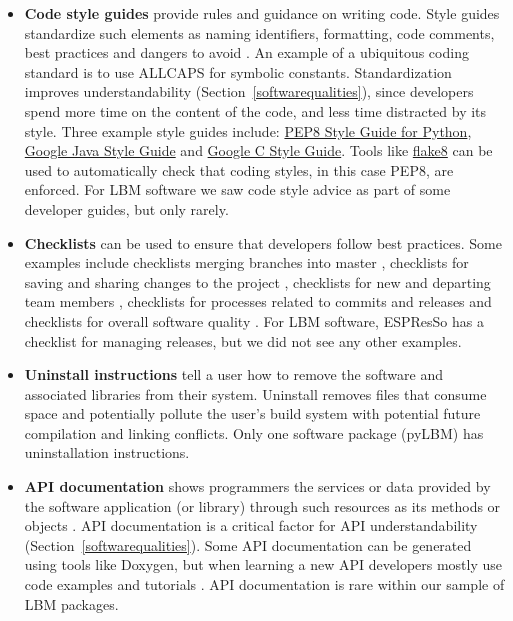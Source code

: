 \documentclass[final, 3p, times, authoryear]{elsarticle}
\newcommand{\CC}{C\nolinebreak\hspace{-.05em}\raisebox{.4ex}{\small\bf
+}\nolinebreak\hspace{-.10em}\raisebox{.4ex}{\small\bf +}}
\begin{document}
\begin{itemize}
\item \textbf{Code style guides} provide rules and guidance on writing code.
Style guides standardize such elements as naming identifiers, formatting, code
comments, best practices and dangers to avoid \citep{Carty2020}. An example of a
ubiquitous coding standard is to use ALLCAPS for symbolic constants.
Standardization improves understandability (Section~\ref{softwarequalities}),
since developers spend more time on the content of the code, and less time
distracted by its style.  Three example style guides include:
\href{http://cnl.sogang.ac.kr/cnlab/lectures/programming/python/PEP8_Style_Guide.pdf}
{PEP8 Style Guide for Python},
\href{https://google.github.io/styleguide/javaguide.html} {Google Java Style
Guide} and \href{https://google.github.io/styleguide/cppguide.html} {Google \CC
Style Guide}.  Tools like \href{https://pypi.org/project/flake8/}{flake8} can be
used to automatically check that coding styles, in this case PEP8, are enforced.
For LBM software we saw code style advice as part of some developer guides, but
only rarely.

\item \textbf{Checklists} can be used to ensure that developers follow best
practices.  Some examples include checklists merging branches into master
\citep{Brown2015}, checklists for saving and sharing changes to the project
\citep{WilsonEtAl2016}, checklists for new and departing team members
\citep{HerouxAndBernholdt2018}, checklists for processes related to commits and
releases \citep{HerouxEtAl2008} and checklists for overall software quality
\citep{ThielEtAl2020, SSI2022}.  For LBM software, ESPResSo has a checklist for
managing releases, but we did not see any other examples.

\item \textbf{Uninstall instructions} tell a user how to remove the software and
associated libraries from their system.  Uninstall removes files that consume
space and potentially pollute the user's build system with potential future
compilation and linking conflicts.  Only one software package (pyLBM) has
uninstallation instructions.

\item \textbf{API documentation} shows programmers the services or data provided
by the software application (or library) through such resources as its methods
or objects \citep{MengEtAl2018}.  API documentation is a critical factor for API
understandability \citep{MengEtAl2018} (Section~\ref{softwarequalities}). Some
API documentation can be generated using tools like Doxygen, but when learning a
new API developers mostly use code examples and tutorials \citep{MengEtAl2018}.
API documentation is rare within our sample of LBM packages.

\end{itemize}
\end{document}
